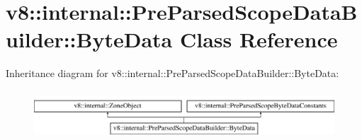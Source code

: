 \hypertarget{classv8_1_1internal_1_1PreParsedScopeDataBuilder_1_1ByteData}{}\section{v8\+:\+:internal\+:\+:Pre\+Parsed\+Scope\+Data\+Builder\+:\+:Byte\+Data Class Reference}
\label{classv8_1_1internal_1_1PreParsedScopeDataBuilder_1_1ByteData}
Inheritance diagram for v8\+:\+:internal\+:\+:Pre\+Parsed\+Scope\+Data\+Builder\+:\+:Byte\+Data\+:\begin{figure}[H]
\begin{center}
\leavevmode
\includegraphics[height=1.824104cm]{classv8_1_1internal_1_1PreParsedScopeDataBuilder_1_1ByteData}
\end{center}
\end{figure}
